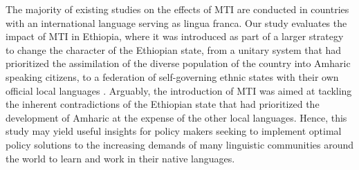 


The majority of existing studies on the effects of MTI are conducted in countries with an international language serving as lingua franca. Our study evaluates the impact of MTI in Ethiopia, where it was introduced as part of a larger strategy to change the character of the Ethiopian state, from a unitary system that had prioritized the assimilation of the diverse population of the country into Amharic speaking citizens, to a federation of self-governing ethnic states with their own official local languages \citep{bulcha_politics_1997,getachew_language_2006}. Arguably, the introduction of MTI was aimed at tackling the inherent contradictions of the Ethiopian state that had prioritized the development of Amharic at the expense of the other local languages. Hence, this study may yield useful insights for policy makers seeking to implement optimal policy solutions to the increasing demands of many linguistic communities around the world to learn and work in their native languages. 


